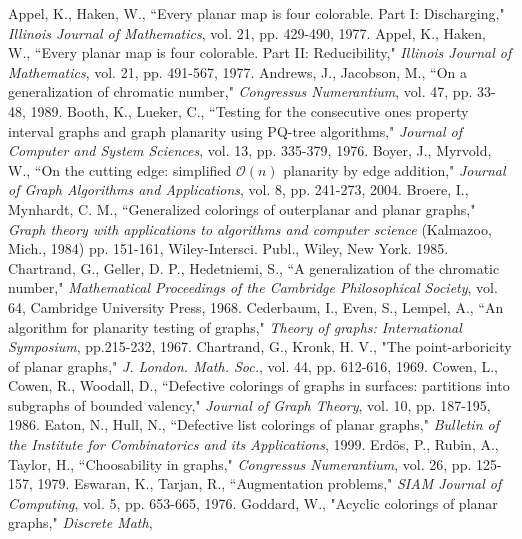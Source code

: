 \documentclass[letterpaper, 12pt]{article}
\theoremstyle{definition}
\theoremstyle{definition}
\theoremstyle{thm}
\theoremstyle{definition}
\begin{document}
\begin{thebibliography}{99}  %
	Appel, K., Haken, W., ``Every planar map is four colorable. Part I:
	Discharging," \textit{Illinois Journal of Mathematics}, vol. 21, pp. 429-490,
	1977.
	Appel, K., Haken, W., ``Every planar map is four colorable. Part II:
	Reducibility," \textit{Illinois Journal of Mathematics}, vol. 21, pp.
	491-567, 1977.
	Andrews, J., Jacobson, M., ``On a generalization of chromatic number,"
	\textit{Congressus Numerantium}, vol. 47, pp. 33-48, 1989.
	Booth, K., Lueker, C., ``Testing for the consecutive ones property interval
	graphs and graph planarity using PQ-tree algorithms," \textit{Journal of
	Computer and System Sciences}, vol. 13, pp. 335-379, 1976.
	Boyer, J., Myrvold, W., ``On the cutting edge: simplified $\mathcal{O}(n)$ planarity by
	edge addition," \textit{Journal of Graph Algorithms and Applications}, vol.
	8, pp. 241-273, 2004.
	Broere, I., Mynhardt, C. M., ``Generalized colorings of outerplanar and planar
	graphs," \textit{Graph theory with applications to algorithms and computer science}
	(Kalmazoo, Mich., 1984) pp. 151-161, Wiley-Intersci. Publ., Wiley, New York. 1985.
	Chartrand, G., Geller, D. P., Hedetniemi, S., ``A generalization of the
	chromatic number," \textit{Mathematical Proceedings of the Cambridge
	Philosophical Society}, vol. 64, Cambridge University Press, 1968.
	Cederbaum, I., Even, S., Lempel, A., ``An algorithm for planarity testing of
	graphs," \textit{Theory of graphs: International Symposium}, pp.215-232,
	1967.
    Chartrand, G., Kronk, H. V., "The point-arboricity of planar graphs,"
    \textit{J. London. Math. Soc.}, vol. 44, pp. 612-616, 1969.
	Cowen, L., Cowen, R., Woodall, D., ``Defective colorings of graphs in
	surfaces: partitions into subgraphs of bounded valency,"
	\textit{Journal of Graph Theory}, vol. 10, pp. 187-195, 1986.
	Eaton, N., Hull, N., ``Defective list colorings of planar graphs,"
	\emph{Bulletin of the Institute for Combinatorics and its Applications},
	1999.
	Erd{\"o}s, P., Rubin, A., Taylor, H., ``Choosability in graphs,"
	\textit{Congressus Numerantium}, vol. 26, pp. 125-157, 1979.
	Eswaran, K., Tarjan, R., ``Augmentation problems," \textit{SIAM Journal of
	Computing}, vol. 5, pp. 653-665, 1976.
    Goddard, W., "Acyclic colorings of planar graphs," \textit{Discrete Math},

\end{thebibliography}
\end{document}
